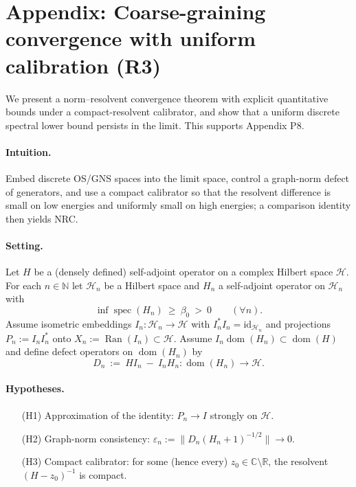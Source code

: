 \documentclass[11pt]{amsart}
\theoremstyle{plain}
\theoremstyle{definition}
\theoremstyle{remark}
\begin{document}
\section{Appendix: Coarse-graining convergence with uniform calibration (R3)}

We present a norm–resolvent convergence theorem with explicit quantitative bounds under a compact-resolvent calibrator, and show that a uniform discrete spectral lower bound persists in the limit. This supports Appendix P8.

\paragraph{Intuition.} Embed discrete OS/GNS spaces into the limit space, control a graph-norm defect of generators, and use a compact calibrator so that the resolvent difference is small on low energies and uniformly small on high energies; a comparison identity then yields NRC.

\paragraph{Setting.}
Let $H$ be a (densely defined) self-adjoint operator on a complex Hilbert space $\mathcal H$. For each $n\in\mathbb N$ let $\mathcal H_n$ be a Hilbert space and $H_n$ a self-adjoint operator on $\mathcal H_n$ with
\[
  \inf\operatorname{spec}(H_n)\ \ge\ \beta_0\ >\ 0\qquad(\forall n).
\]
Assume isometric embeddings $I_n:\mathcal H_n\to\mathcal H$ with $I_n^*I_n=\mathrm{id}_{\mathcal H_n}$ and projections $P_n:=I_n I_n^*$ onto $X_n:=\operatorname{Ran}(I_n)\subset\mathcal H$. Assume $I_n\operatorname{dom}(H_n)\subset\operatorname{dom}(H)$ and define defect operators on $\operatorname{dom}(H_n)$ by
\[
  D_n\ :=\ H I_n\ -\ I_n H_n: \operatorname{dom}(H_n)\to\mathcal H.
\]
\paragraph{Hypotheses.}
\begin{itemize}
  \item[(H1)] Approximation of the identity: $P_n\to I$ strongly on $\mathcal H$.
  \item[(H2)] Graph-norm consistency: $\varepsilon_n:=\bigl\| D_n (H_n+1)^{-1/2}\bigr\|\to 0$.
  \item[(H3)] Compact calibrator: for some (hence every) $z_0\in\mathbb C\setminus\mathbb R$, the resolvent $(H-z_0)^{-1}$ is compact.
\end{itemize}
\end{document}
